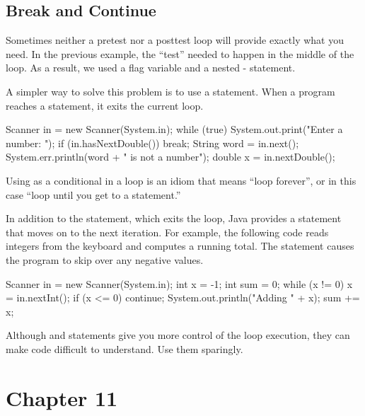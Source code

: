\subsection*{Break and Continue}

Sometimes neither a pretest nor a posttest loop will provide exactly what you need.
In the previous example, the ``test'' needed to happen in the middle of the loop.
As a result, we used a flag variable and a nested - statement.


A simpler way to solve this problem is to use a  statement.
When a program reaches a  statement, it exits the current loop.

\begin{code}
Scanner in = new Scanner(System.in);
while (true) {
    System.out.print("Enter a number: ");
    if (in.hasNextDouble()) {
        break;
    }
    String word = in.next();
    System.err.println(word + " is not a number");
}
double x = in.nextDouble();
\end{code}

Using  as a conditional in a  loop is an idiom that means ``loop forever'', or in this case ``loop until you get to a  statement.''


In addition to the  statement, which exits the loop, Java provides a  statement that moves on to the next iteration.
For example, the following code reads integers from the keyboard and computes a running total.
The  statement causes the program to skip over any negative values.

\begin{code}
Scanner in = new Scanner(System.in);
int x = -1;
int sum = 0;
while (x != 0) {
    x = in.nextInt();
    if (x <= 0) {
        continue;
    }
    System.out.println("Adding " + x);
    sum += x;
}
\end{code}

Although  and  statements give you more control of the loop execution, they can make code difficult to understand.
Use them sparingly.


\section{Chapter 11}

